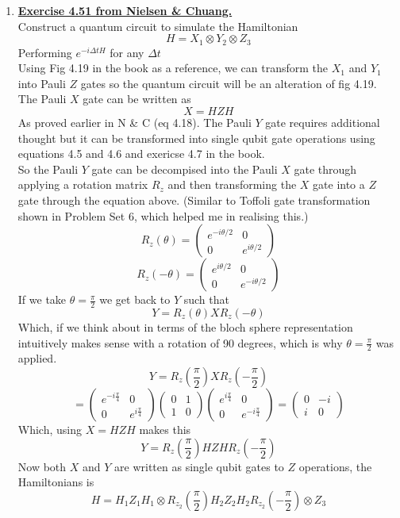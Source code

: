 \documentclass[12pt]{article}
\begin{document}
\begin{enumerate}
\item \textbf{\underline{Exercise 4.51 from Nielsen \& Chuang.}}
\\
Construct a quantum circuit to simulate the Hamiltonian 
$$ H = X_1 \otimes Y_2 \otimes Z_3 $$ 
Performing $e^{-i \Delta t H}$ for any $\Delta t$ 
\\
Using Fig 4.19 in the book as a reference, we can transform the $X_1$ and $Y_1$ into Pauli $Z$ gates so the quantum circuit will be an alteration of fig 4.19. 
\\
The Pauli $X$ gate can be written as 
$$ X = HZH$$ 
As proved earlier in N \& C (eq 4.18). The Pauli $Y$ gate requires additional thought but it can be transformed into single qubit gate operations using equations 4.5 and 4.6 and exericse 4.7 in the book. 
\\
So the Pauli $Y$ gate can be decompised into the Pauli $X$ gate through applying a rotation matrix $R_z$ and then transforming the $X$ gate into a $Z$ gate through the equation above. (Similar to Toffoli gate transformation shown in Problem Set 6, which helped me in realising this.)
$$ R_z (\theta) =  \left(\begin{array}{cc} e^{-i \theta /2} & 0 \\  0 & e^{i \theta /2} \end{array}\right) $$
$$ R_z (-\theta) = \left(\begin{array}{cc} e^{i \theta /2} & 0 \\  0 & e^{-i \theta /2} \end{array}\right) $$
If we take $\theta = \frac{\pi}{2}$ we get back to $Y$ such that 
$$ Y = R_z (\theta) X R_z (-\theta) $$
Which, if we think about in terms of the bloch sphere representation intuitively makes sense with a rotation of 90 degrees, which is why $\theta = \frac{\pi}{2}$ was applied. 
$$  Y = R_z ( \frac{\pi}{2}) X R_z (- \frac{\pi}{2}) $$
$$ = \left(\begin{array}{cc} e^{-i \frac{\pi}{4}} & 0 \\  0 & e^{i \frac{\pi}{4}} \end{array}\right) \left(\begin{array}{cc} 0 & 1 \\  1 & 0 \end{array}\right) \left(\begin{array}{cc} e^{i \frac{\pi}{4}} & 0 \\  0 & e^{-i \frac{\pi}{4}} \end{array}\right) = \left(\begin{array}{cc} 0 & -i \\  i & 0 \end{array}\right) $$
Which, using $X = HZH$ makes this 
$$ Y = R_z (\frac{\pi}{2}) HZH R_z(- \frac{\pi}{2}) $$
Now both $X$ and $Y$ are written as single qubit gates to $Z$ operations, the Hamiltonians is 
$$ H = H_1 Z_1 H_1 \otimes R_{z_2}(\frac{\pi}{2}) H_2 Z_2 H_2 R_{z_2}(-\frac{\pi}{2}) \otimes Z_3 $$


\end{enumerate}
\end{document}
